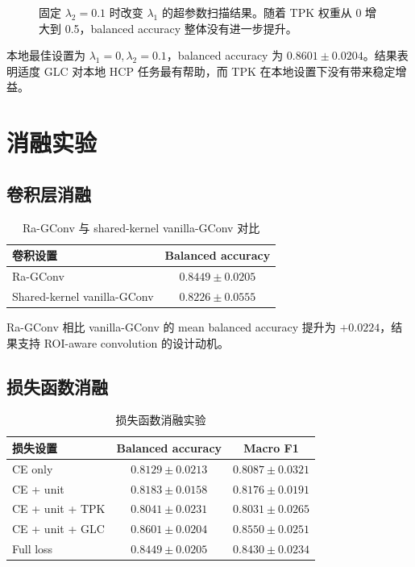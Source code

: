 \begin{figure}[H]
  \centering
  \caption{固定 $\lambda_2=0.1$ 时改变 $\lambda_1$ 的超参数扫描结果。随着 TPK 权重从 0 增大到 0.5，balanced accuracy 整体没有进一步提升。}
  \label{fig:hparam-lambda2-01}
\end{figure}

本地最佳设置为 $\lambda_1=0,\lambda_2=0.1$，balanced accuracy 为 $0.8601 \pm 0.0204$。结果表明适度 GLC 对本地 HCP 任务最有帮助，而 TPK 在本地设置下没有带来稳定增益。

\section{消融实验}

\subsection{卷积层消融}

\begin{table}[H]
  \centering
  \caption{Ra-GConv 与 shared-kernel vanilla-GConv 对比}
  \begin{tabular}{lc}
    \toprule
    卷积设置 & Balanced accuracy \\
    \midrule
    Ra-GConv & $0.8449 \pm 0.0205$ \\
    Shared-kernel vanilla-GConv & $0.8226 \pm 0.0555$ \\
    \bottomrule
  \end{tabular}
\end{table}

Ra-GConv 相比 vanilla-GConv 的 mean balanced accuracy 提升为 $+0.0224$，结果支持 ROI-aware convolution 的设计动机。

\subsection{损失函数消融}

\begin{table}[H]
  \centering
  \caption{损失函数消融实验}
  \begin{tabular}{lcc}
    \toprule
    损失设置 & Balanced accuracy & Macro F1 \\
    \midrule
    CE only & $0.8129 \pm 0.0213$ & $0.8087 \pm 0.0321$ \\
    CE + unit & $0.8183 \pm 0.0158$ & $0.8176 \pm 0.0191$ \\
    CE + unit + TPK & $0.8041 \pm 0.0231$ & $0.8031 \pm 0.0265$ \\
    CE + unit + GLC & $\mathbf{0.8601 \pm 0.0204}$ & $\mathbf{0.8550 \pm 0.0251}$ \\
    Full loss & $0.8449 \pm 0.0205$ & $0.8430 \pm 0.0234$ \\
    \bottomrule
  \end{tabular}
\end{table}


